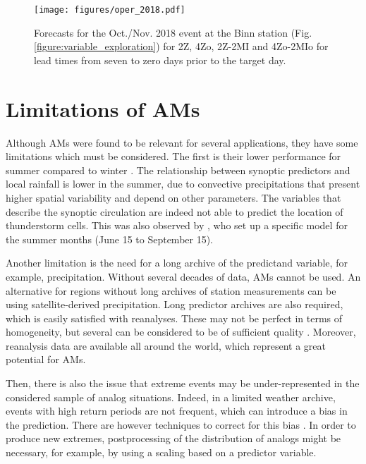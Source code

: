 \documentclass[review]{elsarticle}
\begin{document}
\begin{figure*}[hbt!]
	\texttt{[image: figures/oper\_2018.pdf]}
	\caption{Forecasts for the Oct./Nov. 2018 event at the Binn station (Fig. \ref{figure:variable_exploration}) for 2Z, 4Zo, 2Z-2MI and 4Zo-2MIo for lead times from seven to zero days prior to the target day.}
	\label{figure:operational_2018}
\end{figure*}
\clearpage

\section{Limitations of AMs}
\label{sec:limitations}

Although AMs were found to be relevant for several applications, they have some limitations which must be considered. The first is their lower performance for summer compared to winter \citep{Bliefernicht2010}. The relationship between synoptic predictors and local rainfall is lower in the summer, due to convective precipitations that present higher spatial variability and depend on other parameters. The variables that describe the synoptic circulation are indeed not able to predict the location of thunderstorm cells. This was also observed by \citet{BenDaoud2010}, who set up a specific model for the summer months (June 15 to September 15).

Another limitation is the need for a long archive of the predictand variable, for example, precipitation. Without several decades of data, AMs cannot be used. An alternative for regions without long archives of station measurements can be using satellite-derived precipitation. Long predictor archives are also required, which is easily satisfied with reanalyses. These may not be perfect in terms of homogeneity, but several can be considered to be of sufficient quality \cite{Horton2018b}. Moreover, reanalysis data are available all around the world, which represent a great potential for AMs.

Then, there is also the issue that extreme events may be under-represented in the considered sample of analog situations. Indeed, in a limited weather archive, events with high return periods are not frequent, which can introduce a bias in the prediction. There are however techniques to correct for this bias \citep[see][]{Marty2010}. In order to produce new extremes, postprocessing of the distribution of analogs might be necessary, for example, by using a scaling based on a predictor variable. 
\end{document}
